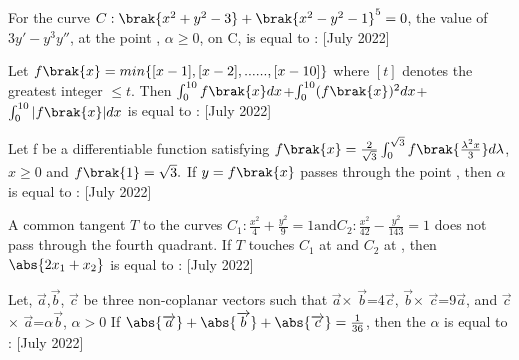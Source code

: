     \item For the curve $C: \brak{x^2+y^2-3}+\brak{x^2-y^2-1}^5=0$, the value of $3y'-y^3y''$, at the point \brak{\alpha,\alpha
    }, $\alpha \geq 0$, on C, is equal to  :
 \hfill{[July 2022]}
    \item Let $f\brak{x}=min\{[x-1],[x-2],......,[x-10]\}$ where $[t]$ denotes the greatest integer $\leq t$. Then $\int_{0}^{10}f\brak{x}dx$+$\int_{0}^{10}(f\brak{x})^2dx$+$\int_{0}^{10}|f\brak{x}|dx$ is equal to :
\hfill{[July 2022]}
    \item Let f be a differentiable function satisfying $f\brak{x}=\frac{2}{\sqrt{3}}\int_{0}^{\sqrt{3}}  f\brak{\frac{\lambda^2x}{3}}d\lambda$, $x\geq0$ and $f\brak{1}=\sqrt{3}.$ If $y=f\brak{x}$ passes through the point , then $\alpha$ is equal to :
  \hfill{[July 2022]}
    \item A common tangent $T$ to the curves $C_1 : \frac{x^2}{4}+\frac{y^2}{9}=1 \text{and} C_2:\frac{x^2}{42}-\frac{y^2}{143}=1 $ does not pass through the fourth quadrant. If $T$ touches $C_1$ at  and $C_2$ at , then $\abs{2x_1+x_2}$ is equal to :
\hfill{[July 2022]}
    \item Let, $\overrightarrow{a}$,$\overrightarrow{b}$, $\overrightarrow{c}$ be three non-coplanar vectors such that  $\overrightarrow{a}$$\times$ $\overrightarrow{b}$=4$\overrightarrow{c}$,  $\overrightarrow{b}$$\times$ $\overrightarrow{c}$=9$\overrightarrow{a}$, and  $\overrightarrow{c}$$\times$ $\overrightarrow{a}$=$\alpha$$\overrightarrow{b}$, $\alpha >0$
If $\abs{\overrightarrow{a}}+\abs{\overrightarrow{b}}+\abs{\overrightarrow{c}}=\frac{1}{36}$, then the $\alpha$ is equal to :
\hfill{[July 2022]}


